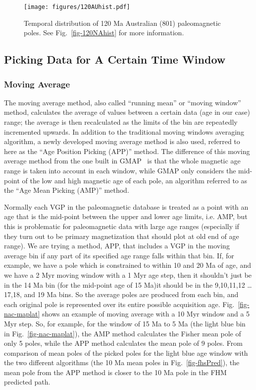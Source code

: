 \begin{figure*}
\centering
\texttt{[image: figures/120AUhist.pdf]}
\caption[Distribution of 120 Ma Australian poles]{Temporal
distribution of 120 Ma Australian (801) paleomagnetic poles. See
Fig.~\ref{fig-120NAhist} for more information.}\label{fig-120AUhist}
\end{figure*}

\subsection{Picking Data for A Certain Time Window}

\subsubsection{Moving Average}

The moving average method, also called ``running mean'' or ``moving
window''~\cite{T08} method, calculates the average of values between a certain
data (age in our case) range; the average is then recalculated as the limits of
the bin are repeatedly incremented upwards. In addition to the traditional
moving windows averaging algorithm, a newly developed moving average method is
also used, referred to here as the ``Age Position Picking (APP)'' method. The
difference of this moving average method from the one built in
GMAP~\cite{T99,T08} is that the whole magnetic age range is taken into account
in each window, while GMAP only considers the mid-point of the low and high
magnetic age of each pole, an algorithm referred to as the ``Age Mean Picking
(AMP)'' method.

Normally each VGP in the paleomagnetic database is treated as a point with an
age that is the mid-point between the upper and lower age limits, i.e. AMP, but
this is problematic for paleomagnetic data with large age ranges (especially if
they turn out to be primary magnetization that should plot at old end of age
range). We are trying a method, APP, that includes a VGP in the moving average
bin if any part of its specified age range falls within that bin. If, for
example, we have a pole which is constrained to within 10 and 20 Ma of age, and
we have a 2 Myr moving window with a 1 Myr age step, then it shouldn't just be
in the 14 Ma bin (for the mid-point age of 15 Ma)\textemdash{}it
should be in the 9,10,11,12
\ldots17,18, and 19 Ma bins. So the
average poles are produced from each bin, and each original pole is represented
over its entire possible acquisition age. Fig.~\ref{fig-nac-maplat} shows an
example of moving average with a 10 Myr window and a 5 Myr step. So, for
example, for the window of 15 Ma to 5 Ma (the light blue bin in
Fig.~\ref{fig-nac-maplat}), the AMP method calculates the Fisher mean pole of
only 5 poles, while the APP method calculates the mean pole of 9 poles. From
comparison of mean poles of the picked poles for the light blue age window with
the two different algorithms (the 10 Ma mean poles in Fig.~\ref{fig-fhsPred}),
the mean pole from the APP method is closer to the 10 Ma pole in the FHM
predicted path.

